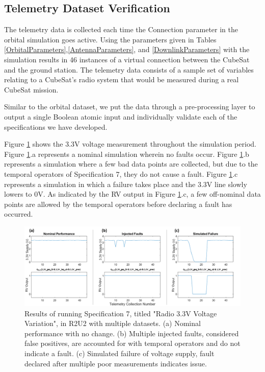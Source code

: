 \documentclass[conf]{new-aiaa}
\begin{document}
\subsection{Telemetry Dataset Verification}

The telemetry data is collected each time the Connection parameter in the orbital simulation goes active. Using the parameters given in Tables \ref{OrbitalParameters},\ref{AntennaParameters}, and \ref{DownlinkParameters} with the simulation results in 46 instances of a virtual connection between the CubeSat and the ground station. The telemetry data consists of a sample set of variables relating to a CubeSat's radio system that would be measured during a real CubeSat mission.

Similar to the orbital dataset, we put the data through a pre-processing layer to output a single Boolean atomic input and individually validate each of the specifications we have developed.

Figure \ref{3V3SpecResults} shows the 3.3V voltage measurement throughout the simulation period. Figure \ref{3V3SpecResults}.a represents a nominal simulation wherein no faults occur. Figure \ref{3V3SpecResults}.b represents a simulation where a few bad data points are collected, but due to the temporal operators of Specification 7, they do not cause a fault. Figure \ref{3V3SpecResults}.c represents a simulation in which a failure takes place and the 3.3V line slowly lowers to 0V. As indicated by the RV output in Figure \ref{3V3SpecResults}.c, a few off-nominal data points are allowed by the temporal operators before declaring a fault has occurred.

\begin{figure}[!ht]
\centering
\includegraphics[width=.8\textwidth]{Fig/3V3_Spec7.png}
\caption{Results of running Specification 7, titled "Radio 3.3V Voltage Variation", in R2U2 with multiple datasets. (a) Nominal performance with no change. (b) Multiple injected faults, considered false positives, are accounted for with temporal operators and do not indicate a fault. (c) Simulated failure of voltage supply, fault declared after multiple poor measurements indicates issue.}
\label{3V3SpecResults}
\end{figure}
\end{document}
